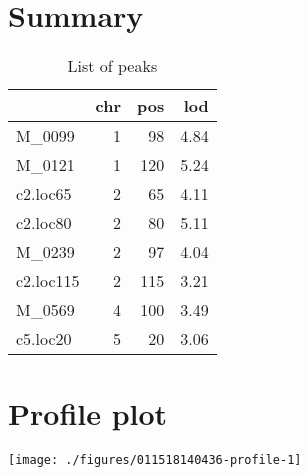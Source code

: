 \documentclass[a4paper,11pt]{article}\usepackage[]{graphicx}\usepackage[]{color}
\makeatletter
\def\maxwidth{ %
  \ifdim\Gin@nat@width>\linewidth
    \linewidth
  \else
    \Gin@nat@width
  \fi
}
\newenvironment{knitrout}{}{} %
\makeatother
\begin{document}
\section{Summary}
\begin{table}[ht]
\begin{flushleft}
\caption{List of peaks} 
\label{summary}
\begin{tabular}{lrrr}
  \hline
 & chr & pos & lod \\ 
  \hline
M\_0099 & 1 & 98 & 4.84 \\ 
  M\_0121 & 1 & 120 & 5.24 \\ 
  c2.loc65 & 2 & 65 & 4.11 \\ 
  c2.loc80 & 2 & 80 & 5.11 \\ 
  M\_0239 & 2 & 97 & 4.04 \\ 
  c2.loc115 & 2 & 115 & 3.21 \\ 
  M\_0569 & 4 & 100 & 3.49 \\ 
  c5.loc20 & 5 & 20 & 3.06 \\ 
   \hline
\end{tabular}
\end{flushleft}
\end{table}

\newpage
\section{Profile plot}
\begin{knitrout}
\color{fgcolor}

\texttt{[image: ./figures/011518140436-profile-1]} \hfill{}



\end{knitrout}
\end{document}
